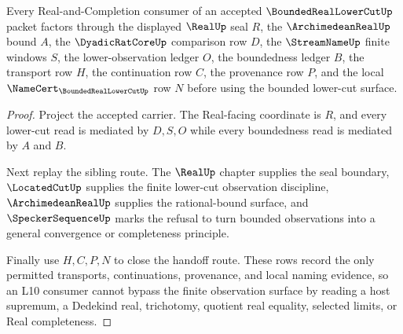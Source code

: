 \begin{theorem}
\label{thm:bounded-real-lower-cut-l10-handoff}
Every Real-and-Completion consumer of an accepted $\BoundedRealLowerCutUp$ packet factors through the displayed $\RealUp$ seal $R$, the $\ArchimedeanRealUp$ bound $A$, the $\DyadicRatCoreUp$ comparison row $D$, the $\StreamNameUp$ finite windows $S$, the lower-observation ledger $O$, the boundedness ledger $B$, the transport row $H$, the continuation row $C$, the provenance row $P$, and the local $\NameCert_{\BoundedRealLowerCutUp}$ row $N$ before using the bounded lower-cut surface.
\end{theorem}
\begin{proof}
Project the accepted carrier. The Real-facing coordinate is $R$, and every lower-cut read is mediated by $D,S,O$ while every boundedness read is mediated by $A$ and $B$.

Next replay the sibling route. The $\RealUp$ chapter supplies the seal boundary, $\LocatedCutUp$ supplies the finite lower-cut observation discipline, $\ArchimedeanRealUp$ supplies the rational-bound surface, and $\SpeckerSequenceUp$ marks the refusal to turn bounded observations into a general convergence or completeness principle.

Finally use $H,C,P,N$ to close the handoff route. These rows record the only permitted transports, continuations, provenance, and local naming evidence, so an L10 consumer cannot bypass the finite observation surface by reading a host supremum, a Dedekind real, trichotomy, quotient real equality, selected limits, or Real completeness.
\end{proof}

\begin{closurestatus}{\BoundedRealLowerCutUp}
  \theoryclosure{\seedClosure}
  \formalstatus{\unformalizedV}
\end{closurestatus}
